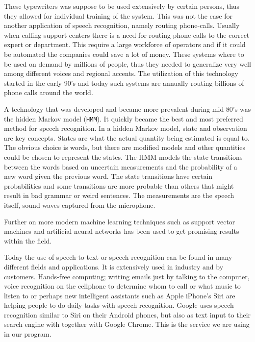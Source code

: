 \documentclass[a4paper,12pt,twoside]{ltxdoc}
\begin{document}
These typewriters was suppose to be used extensively by certain persons, thus they allowed for individual training of the system. This was not the case for another application of speech recognition, namely routing phone-calls. Usually when calling support centers there is a need for routing phone-calls to the correct expert or department. This require a large workforce of operators and if it could be automated the companies could save a lot of money. These systems where to be used on demand by millions of people, thus they needed to generalize very well among different voices and regional accents. The utilization of this technology started in the early 90's and today such systems are annually routing billions of phone calls around the world. 

A technology that was developed and became more prevalent during mid 80's was the hidden Markov model (\verb#HMM#). It quickly became the best and most preferred method for speech recognition. In a hidden Markov model, state and observation are key concepts. States are what the actual quantity being estimated is equal to. The obvious choice is words, but there are modified models and other quantities could be chosen to represent the states. The HMM models the state transitions between the words based on uncertain measurements and the probability of a new word given the previous word. The state transitions have certain probabilities and some transitions are more probable than others that might result in bad grammar or weird sentences.  The measurements are the speech itself, sound waves captured from the microphone\cite{history}.

Further on more modern machine learning techniques such as support vector machines and artificial neural networks has been used to get promising results within the field.

Today the use of speech-to-text or speech recognition can be found in many different fields and applications. It is extensively used in industry and by customers. Hands-free computing; writing emails just by talking to the computer, voice recognition on the cellphone to determine whom to call or what music to listen to or perhaps new intelligent assistants such as Apple iPhone's Siri are helping people to do daily tasks with speech recognition. Google uses speech recognition similar to Siri on their Android phones, but also as text input to their search engine with together with Google Chrome. This is the service we are using in our program.


\end{document}
